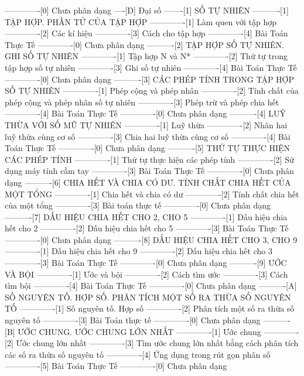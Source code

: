 -------------[0] Chưa phân dạng
----[D] Đại số
-------[1] SỐ TỰ NHIÊN
----------[1] TẬP HỢP. PHẦN TỬ CỦA TẬP HỢP
-------------[1] Làm quen với tập hợp
-------------[2] Các kí hiệu
-------------[3] Cách cho tập hợp
-------------[4] Bài Toán Thực Tế
-------------[0] Chưa phân dạng
----------[2] TẬP HỢP SỐ TỰ NHIÊN. GHI SỐ TỰ NHIÊN
-------------[1] Tập hợp N và N*
-------------[2] Thứ tự trong tập hợp số tự nhiên
-------------[3] Ghi số tự nhiên
-------------[4] Bài Toán Thực Tế
-------------[0] Chưa phân dạng
----------[3] CÁC PHÉP TÍNH TRONG TẬP HỢP SỐ TỰ NHIÊN
-------------[1] Phép cộng và phép nhân
-------------[2] Tính chất của phép cộng và phép nhân số tự nhiên
-------------[3] Phép trừ và phép chia hết
-------------[4] Bài Toán Thực Tế
-------------[0] Chưa phân dạng
----------[4] LUỸ THỪA VỚI SỐ MŨ TỰ NHIÊN
-------------[1] Luỹ thừa
-------------[2] Nhân hai luỹ thừa cùng cơ số
-------------[3] Chia hai luỹ thừa cùng cơ số
-------------[4] Bài Toán Thực Tế
-------------[0] Chưa phân dạng
----------[5] THỨ TỰ THỰC HIỆN CÁC PHÉP TÍNH
-------------[1] Thứ tự thực hiện các phép tính
-------------[2] Sử dụng máy tính cầm tay
-------------[3] Bài Toán Thực Tế
-------------[0] Chưa phân dạng
----------[6] CHIA HẾT VÀ CHIA CÓ DƯ. TÍNH CHẤT CHIA HẾT CỦA MỘT TỔNG
-------------[1] Chia hết và chia có dư
-------------[2] Tính chất chia hết của một tổng
-------------[3] Bài toán thực tế
-------------[0] Chưa phân dạng
----------[7] DẤU HIỆU CHIA HẾT CHO 2, CHO 5
-------------[1] Dấu hiệu chia hết cho 2
-------------[2] Dấu hiệu chia hết cho 5
-------------[3] Bài Toán Thực Tế
-------------[0] Chưa phân dạng
----------[8] DẤU HIỆU CHIA HẾT CHO 3, CHO 9
-------------[1] Dấu hiệu chia hết cho 9
-------------[2] Dấu hiệu chia hết cho 3
-------------[3] Bài Toán Thực Tế
-------------[0] Chưa phân dạng
----------[9] ƯỚC VÀ BỘI
-------------[1] Ước và bội
-------------[2] Cách tìm ước
-------------[3] Cách tìm bội
-------------[4] Bài Toán Thực Tế
-------------[0] Chưa phân dạng
----------[A] SỐ NGUYÊN TỐ. HỢP SỐ. PHÂN TÍCH MỘT SỐ RA THỪA SỐ NGUYÊN TỐ
-------------[1] Số nguyên tố. Hợp số
-------------[2] Phân tích một số ra thừa số nguyên tố
-------------[3] Bài Toán thực tế
-------------[0] Chưa phân dạng
----------[B] ƯỚC CHUNG. ƯỚC CHUNG LỚN NHẤT
-------------[1] Ước chung
-------------[2] Ước chung lớn nhất
-------------[3] Tìm ước chung lớn nhất bằng cách phân tích các số ra thừa số nguyên tố
-------------[4] Ứng dụng trong rút gọn phân số
-------------[5] Bài Toán Thực Tế
-------------[0] Chưa phân dạng
